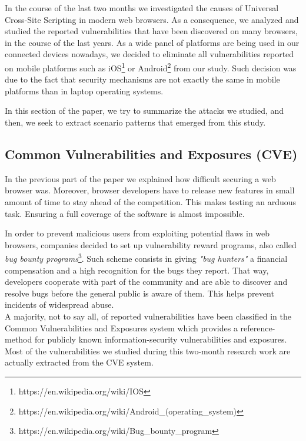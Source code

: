 \documentclass[journal]{IEEEtran}
\begin{document}
In the course of the last two months we investigated the causes of Universal Cross-Site Scripting in modern web browsers. As a consequence, we analyzed and studied the reported vulnerabilities that have been discovered on many browsers, in the course of the last years.
As a wide panel of platforms are being used in our connected devices nowadays, we decided to eliminate all vulnerabilities reported on mobile platforms such as iOS\footnote{https://en.wikipedia.org/wiki/IOS} or Android\footnote{https://en.wikipedia.org/wiki/Android\_(operating\_system)} from our study. Such decision was due to the fact that security mechanisms are not exactly the same in mobile platforms than in laptop operating systems.

\medskip

In this section of the paper, we try to summarize the attacks we studied, and then, we seek to extract scenario patterns that emerged from this study. 

\subsection{Common Vulnerabilities and Exposures (CVE)}

In the previous part of the paper we explained how difficult securing a web browser was. Moreover, browser developers have to release new features in small amount of time to stay ahead of the competition. This makes testing an arduous task. Ensuring a full coverage of the software is almost impossible.

\medskip

In order to prevent malicious users from exploiting potential flaws in web browsers, companies decided to set up vulnerability reward programs, also called \emph{bug bounty programs}\footnote{https://en.wikipedia.org/wiki/Bug\_bounty\_program}. Such scheme consists in giving \emph{"bug hunters"} a financial compensation and a high recognition for the bugs they report. That way, developers cooperate with part of the community and are able to discover and resolve bugs before the general public is aware of them. This helps prevent incidents of widespread abuse. \\
A majority, not to say all, of reported vulnerabilities have been classified in the Common Vulnerabilities and Exposures system which provides a reference-method for publicly known information-security vulnerabilities and exposures. \\

Most of the vulnerabilities we studied during this two-month research work are actually extracted from the CVE system. \\
\end{document}
